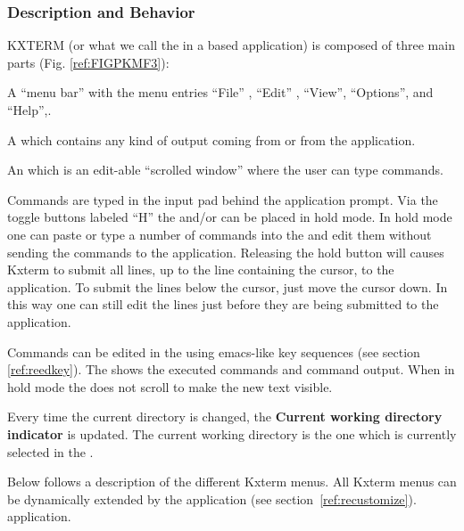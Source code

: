 \subsubsection{Description and Behavior}

KXTERM (or what we call the \EW{} in a \KUIP{} based application)
is composed of three main parts (Fig. \ref{ref:FIGPKMF3}):
\vspace{-.5\baselineskip}
\begin{UL}
\item
A ``menu bar'' with the menu entries ``File'' ,  ``Edit'' ,
``View'', ``Options'', and ``Help'',.
\item
A \TP{}  which contains any kind of output coming from \KUIP{}
or from the application.
\item
An \INP{}  which is an edit-able ``scrolled window'' where the user
can type commands.
\end{UL}

Commands are typed in the input pad behind the application prompt.
Via the toggle buttons  labeled ``H'' the \INP{} and/or \TP{}
can be placed in hold mode. In hold mode one can paste or type
a number of commands into the \INP{} and edit them without sending
the commands to the application. Releasing the hold button
will causes Kxterm to submit all lines, up to the line containing the
cursor, to the application. To submit the lines below the cursor,
just move the cursor down. In this way one can still edit the
lines just before they are being submitted to the application.

Commands can be edited in the \INP{} using emacs-like key
sequences (see section \ref{ref:reedkey}).
The \TP{} shows the executed commands and command
output. When in hold mode the \TP{} does not scroll to
make the new text visible.

Every time the current directory is changed, the {\bf Current working
directory indicator}   is updated. The current working directory 
is the one which is currently selected in the \MB{}.

Below follows a description of the different Kxterm menus.
All Kxterm menus can be dynamically extended by the 
\ifKUIPman
  application (see section~\ref{ref:recustomize}).
\else
  application.
\fi

